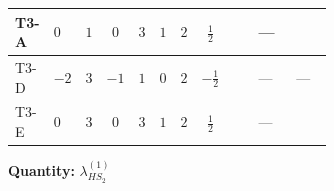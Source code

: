 \documentclass[8pt]{article}
\begin{document}
\begin{landscape}
\begin{longtable}{@{}llcccccc >{\raggedright\arraybackslash}p{0.21\linewidth} >{\raggedright\arraybackslash}p{0.21\linewidth} >{\raggedright\arraybackslash}p{0.21\linewidth}@{}}
\midrule
T3-A & $0$ & $1$ & $0$ & $3$ & $1$ & $2$ & $\frac{1}{2}$ & \scriptsize\adjustbox{max width=\linewidth}{$\begin{gathered} +8 {\lambda_{HS_2}^{(1)}} {\lambda_{S_2}^{(1)}}\end{gathered}$} & --- & \scriptsize\adjustbox{max width=\linewidth}{$\begin{gathered} {\lambda_{HS_2}^{(1)}} (6 \operatorname{Tr}\!\left({Y_d}\,\left({Y_d}\right)^{\dagger}\right)+2 \operatorname{Tr}\!\left({Y_e}\,\left({Y_e}\right)^{\dagger}\right)+6 \operatorname{Tr}\!\left({Y_u}\,\left({Y_u}\right)^{\dagger}\right)+4 {\lambda_{S_2}^{(A)}})\end{gathered}$} \\
\midrule
T3-D & $-2$ & $3$ & $-1$ & $1$ & $0$ & $2$ & $-\frac{1}{2}$ & \scriptsize\adjustbox{max width=\linewidth}{$\begin{gathered} +4 {\lambda_{HS_2}^{(1)}} {\lambda_{S_2}^{(1)}}\end{gathered}$} & --- & --- \\
\midrule
T3-E & $0$ & $3$ & $0$ & $3$ & $1$ & $2$ & $\frac{1}{2}$ & \scriptsize\adjustbox{max width=\linewidth}{$\begin{gathered} +8 {\lambda_{HS_2}^{(1)}} {\lambda_{S_2}^{(1)}}\end{gathered}$} & --- & \scriptsize\adjustbox{max width=\linewidth}{$\begin{gathered} {\lambda_{HS_2}^{(1)}} (6 \operatorname{Tr}\!\left({Y_d}\,\left({Y_d}\right)^{\dagger}\right)+2 \operatorname{Tr}\!\left({Y_e}\,\left({Y_e}\right)^{\dagger}\right)+6 \operatorname{Tr}\!\left({Y_u}\,\left({Y_u}\right)^{\dagger}\right)+4 {\lambda_{S_2}^{(A)}})\end{gathered}$} \\
\midrule
\bottomrule
\end{longtable}
\clearpage
\noindent\textbf{Quantity: }$\lambda_{HS_2}^{(1)}$\par\smallskip

\end{landscape}
\end{document}
